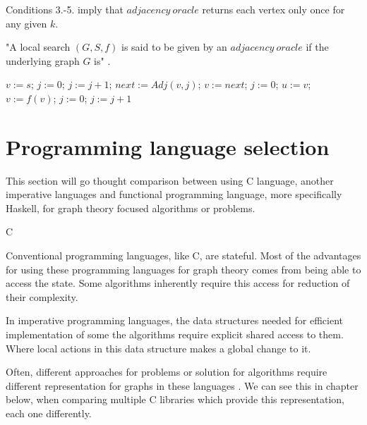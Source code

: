 \begin{definition}
Conditions 3.-5. imply that $adjacency\ oracle$ returns each vertex only once for any given $k$.

"A local search $(G,S,f)$ is said to be given by an $adjacency\ oracle$ if the underlying graph $G$ is" \parencite{avis1996reverse}.

\begin{algorithmic}

    \State $v := s$;
    \State $j := 0$;
    \Repeat
            \State $j := j + 1$;
            \State $next := Adj(v, j)$;
                    \state $v := next$;
                    \state $j := 0$;
                \EndIf
            \EndIf 
        \EndWhile
            \state $u := v$;
            \state $v := f(v)$;
            \state $j := 0$;
            \Repeat
                \state $j := j + 1$
        \EndIf
\EndFor

\EndFunction
\end{algorithmic}

\end{definition}


\section{Programming language selection}

This section will go thought comparison between using C language, another imperative languages and functional programming language, more specifically Haskell, for graph theory focused algorithms or problems.

C

Conventional programming languages, like C, are stateful. Most of the advantages for using these programming languages for graph theory comes from being able to access the state. Some algorithms inherently require this access for reduction of their complexity.

In imperative programming languages, the data structures needed for efficient implementation of some the algorithms require explicit shared access to them. Where local actions in this data structure makes a global change to it. 

Often, different approaches for problems or solution for algorithms require different representation for graphs in these languages \parencite{king1996functional}. We can see this in chapter below, when comparing multiple C libraries which provide this representation, each one differently.

